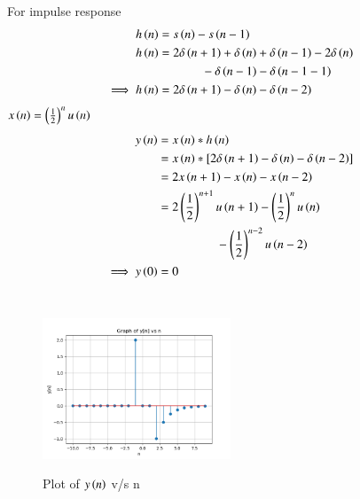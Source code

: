 \documentclass[journal,12pt,twocolumn]{IEEEtran}
\theoremstyle{remark}
\begin{document}
\noindent For impulse response
\begin{align}
h\left(n\right)&=s\left(n\right)-s\left(n-1\right)\\
\notag h\left(n\right) &=2\delta\left(n+1\right)+\delta\left(n\right)+\delta\left(n-1\right)-2\delta\left(n\right) \\
&~~~~~~~~~~~~~~-\delta\left(n-1\right)-\delta\left(n-1-1\right)\\
\implies h\left(n\right) &=2\delta\left(n+1\right)-\delta\left(n\right)-\delta\left(n-2\right)
\end{align}
$x\left(n\right)=\left(\frac{1}{2}\right)^nu\left(n\right)$
\begin{align}
y\left(n\right) &= x\left(n\right)*h\left(n\right)\\
 &= x\left(n\right)*[2\delta\left(n+1\right)-\delta\left(n\right)-\delta\left(n-2\right)]\\
 &= 2x\left(n+1\right)-x\left(n\right)-x\left(n-2\right)\\
\notag  &=2\left(\frac{1}{2}\right)^{n+1}u\left(n+1\right)-\left(\frac{1}{2}\right)^nu\left(n\right)\\
&~~~~~~~~~~~~~~~~~~~-\left(\frac{1}{2}\right)^{n-2}u\left(n-2\right)\\
\implies y\left(0\right) &=0
\end{align}\\
\pagebreak
\begin{figure}[h]
    \includegraphics[width=0.5\textwidth]{2021/EC/40/figs/y(n) vs n.png}\label{fig:stem plot}
    \caption{Plot of $y\left(n\right)$ v/s n}
\end{figure}
\end{document}
